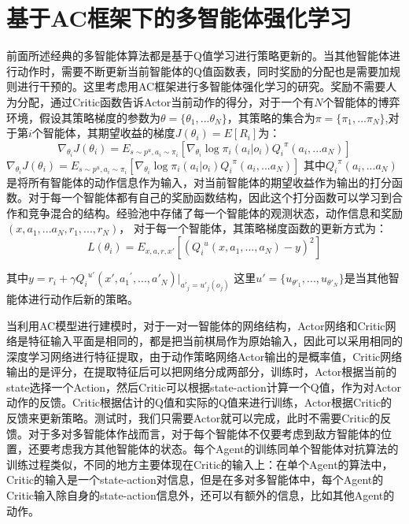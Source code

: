 \section{基于AC框架下的多智能体强化学习}
前面所述经典的多智能体算法都是基于Q值学习进行策略更新的。当其他智能体进行动作时，需要不断更新当前智能体的Q值函数表，同时奖励的分配也是需要加规则进行干预的。这里考虑用AC框架进行多智能体强化学习的研究。奖励不需要人为分配，通过Critic函数告诉Actor当前动作的得分，对于一个有$N$个智能体的博弈环境，假设其策略梯度的参数为$\theta  = \{ {\theta _1},...{\theta _N}\} $，其策略的集合为$\pi  = \{ {\pi _1},...{\pi _N}\} $,对于第$i$个智能体，其期望收益的梯度$J({\theta _i}) = E[{R_i}]$为：
\begin{equation}
	{\nabla _{{\theta _i}}}J({\theta _i}) = {E_{s \sim {p^u},{a_i} \sim {\pi _i}}}[{\nabla _{{\theta _i}}}\log {\pi _i}({a_i}|{o_i}){Q_i}^\pi ({a_i},...{a_N})]
\end{equation}
${\nabla _{{\theta _i}}}J({\theta _i}) = {E_{s \sim {p^u},{a_i} \sim {\pi _i}}}[{\nabla _{{\theta _i}}}\log {\pi _i}({a_i}|{o_i}){Q_i}^\pi ({a_i},...{a_N})]$
其中${Q_i}^\pi ({a_i},...{a_N})$是将所有智能体的动作信息作为输入，对当前智能体的期望收益作为输出的打分函数。对于每一个智能体都有自己的奖励函数结构，因此这个打分函数可以学习到合作和竞争混合的结构。经验池中存储了每一个智能体的观测状态，动作信息和奖励$(x,{a_1},...{a_N},{r_1},...,{r_N})$，
对于每一个智能体，其策略梯度函数的更新方式为：
\begin{equation}
	L({\theta _i}) = {E_{x,a,r,x'}}[{({Q_i}^u(x,{a_1},...,{a_N}) - y)^2}]
\end{equation}

其中$y = {r_i} + \gamma {Q_i}^{u'}(x',{a_1}^\prime ,...,{a'_N}){|_{{{a'}_j} = {{u'}_j}({o_j})}}$
这里$u' = \{ {u_{{{\theta '}_1}}},...,{u_{{{\theta '}_N}}}\} $是当其他智能体进行动作后新的策略。



当利用AC模型进行建模时，对于一对一智能体的网络结构，Actor网络和Critic网络是特征输入平面是相同的，都是把当前棋局作为原始输入，因此可以采用相同的深度学习网络进行特征提取，由于动作策略网络Actor输出的是概率值，Critic网络输出的是评分，在提取特征后可以把网络分成两部分，训练时，Actor根据当前的state选择一个Action，然后Critic可以根据state-action计算一个Q值，作为对Actor动作的反馈。Critic根据估计的Q值和实际的Q值来进行训练，Actor根据Critic的反馈来更新策略。测试时，我们只需要Actor就可以完成，此时不需要Critic的反馈。对于多对多智能体作战而言，对于每个智能体不仅要考虑到敌方智能体的位置，还要考虑我方其他智能体的状态。每个Agent的训练同单个智能体对抗算法的训练过程类似，不同的地方主要体现在Critic的输入上：在单个Agent的算法中，Critic的输入是一个state-action对信息，但是在多对多智能体中，每个Agent的Critic输入除自身的state-action信息外，还可以有额外的信息，比如其他Agent的动作。


